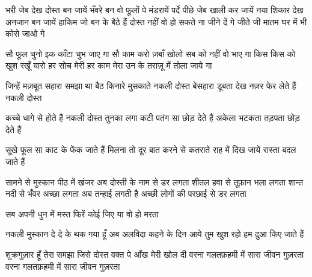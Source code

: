 {{{{{{{{{{{{{{{{भरी जेब देख दोस्त बन जायें
भँवरे बन वो फूलों पे मंडरायें
पर्दे पीछे जेब खाली कर जायें
नया शिकार देख अनजान बन जायें
हाकिम जो बन के बैठे हैं
दोस्त नहीं वो हो सकते
ना जीने दें गे जीते जी
मातम घर में भी कोसे जाओ गे

सौ फूल चुनो इक काँटा चुभ जाए गा
सौ काम करो ज़बाँ खोलो
सब को नहीं वो भाए गा
किस किस को खुश रखूँ यारो
हर सोच मेरी हर काम मेरा
उन के तराज़ू में तोला जाये गा

जिन्हें मज़बूत सहारा समझा था
बैठ किनारे मुसकाते नकली दोस्त
बेसहारा डूबता देख
नज़र फेर लेते हैं नकली दोस्त

कच्चे धागे से होते हैं नकली दोस्त
तुनका लगा कटी पतंग सा छोड़ देते हैं 
अकेला भटकता तड़पता छोड़ देते हैं

सूखे फूल सा काट के फेंक जाते हैं 
मिलना तो दूर बात करने से कतराते
राह में दिख जायें रास्ता बदल जाते हैं

सामने से मुस्कान पीठ में खंजर
अब दोस्ती के नाम से डर लगता
शीतल हवा से तूफ़ान भला लगता
शान्त नदी से भँवर अच्छा लगता
अब तन्हाई लगती है अच्छी
लोगों की परछाई से डर लगता

सब अपनी धुन में मस्त फिरें
कोई जिए या वो हो मरता

नकली मुस्कान दे दे के थक गया हूँ
अब अलविदा कहने के दिन आये
तुम खुश रहो हम दुआ किए जाते हैं

शुक्रगुज़ार हूँ तेरा समझा जिसे दोस्त
वक्त पे आँख मेरी खोल दी
वरना गलतफ़हमी में सारा जीवन गुज़रता
वरना गलतफ़हमी में सारा जीवन गुज़रता
}}}}}}}}}}}}}}}}
